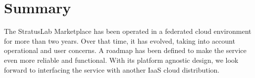 \section{Summary}
\label{sec:summary}

The StratusLab Marketplace has been operated in a federated cloud
environment for more than two years.  Over that time, it has evolved,
taking into account operational and user concerns.  A roadmap has been
defined to make the service even more reliable and functional.  With
its platform agnostic design, we look forward to interfacing the
service with another IaaS cloud distribution.
